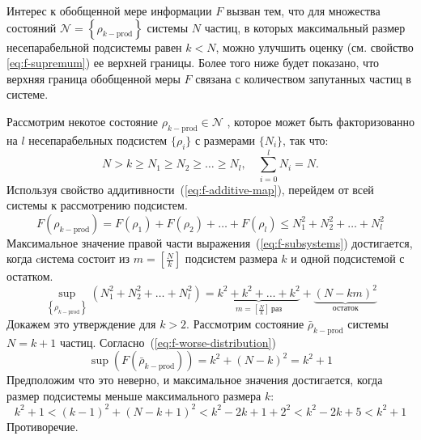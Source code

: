 Интерес к обобщенной мере информации $F$ вызван тем,
что для множества состояний $\mathcal{N} = \left\{\rho_{k-\mathrm{prod}}\right\}$ системы $N$ частиц,
в которых максимальный размер несепарабельной подсистемы равен $k < N$,
можно улучшить оценку (см. свойство \ref{eq:f-supremum}) ее верхней границы.
Более того ниже будет показано,
что верхняя граница обобщенной меры $F$ связана с количеством запутанных частиц в системе.

Рассмотрим некотое состояние $\rho_{k-\mathrm{prod}} \in \mathcal{N}$ ,
которое может быть факторизованно на $l$ несепарабельных подсистем $\{\rho_i\}$ с размерами $\{N_i\}$, так что:
\begin{equation}
  N > k \geq N_1 \geq N_2 \geq \dots \geq N_l, \quad \sum_{i=0}^{l} N_i = N.
\end{equation}
%
Используя свойство аддитивности~(\ref{eq:f-additive-map}),
перейдем от всей системы к рассмотрению подсистем.
%
\begin{equation}\label{eq:f-subsystems}
  F(\rho_{k-\mathrm{prod}}) =
  F(\rho_1) + F(\rho_2) + \dots + F(\rho_l)
  \leq N^2_1 + N^2_2 + \dots + N^2_l
\end{equation}
%
Максимальное значение правой части выражения~(\ref{eq:f-subsystems}) достигается,
когда cистема состоит из $m = \left[\frac N k \right]$ подсистем размера $k$
и одной подсистемой с остатком.
%
\begin{equation}\label{eq:f-worse-distribution}
  \sup_{\left\{\rho_{k-\mathrm{prod}}\right\}}
    \left(N^2_1 + N^2_2 + \dots + N^2_l\right)
  = \underbrace{
    k^2 + k^2 + \dots + k^2
    }_{m = \left[\frac N k \right] \, \mbox{раз}}
    + \underbrace{(N-km)^2}_{\mbox{остаток}}
\end{equation}
%
Докажем это утверждение для $k > 2$.
Рассмотрим состояние $\bar\rho_{k-\mathrm{prod}}$ системы  $N=k+1$ частиц.
Согласно~(\ref{eq:f-worse-distribution})
\begin{equation}
  \sup(F(\bar\rho_{k-\mathrm{prod}})) = k^2 + (N - k)^2 = k^2 + 1
\end{equation}
Предположим что это неверно,
и максимальное значения достигается, когда размер подсистемы меньше максимального размера $k$:
\begin{equation}
  k^2 + 1 < (k-1)^2 + (N - k + 1)^2 < k^2 - 2k + 1 + 2^2 < k^2 - 2k + 5 < k^2 + 1
\end{equation}
Противоречие.

